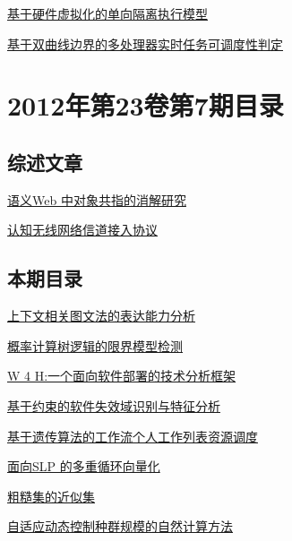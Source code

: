 \documentclass[a4paper]{article}
\begin{document}
\href{http://www.jos.org.cn/ch/reader/download_pdf.aspx?file_no=4131&year_id=2012&quarter_id=8&falg=1}{基于硬件虚拟化的单向隔离执行模型}

\href{http://www.jos.org.cn/ch/reader/download_pdf.aspx?file_no=4139&year_id=2012&quarter_id=8&falg=1}{基于双曲线边界的多处理器实时任务可调度性判定}


\section{\textbf{2012年第23卷第7期目录}}
\subsection{综述文章}
\href{http://www.jos.org.cn/ch/reader/download_pdf.aspx?file_no=4215&year_id=2012&quarter_id=7&falg=1}{语义Web 中对象共指的消解研究}

\href{http://www.jos.org.cn/ch/reader/download_pdf.aspx?file_no=4225&year_id=2012&quarter_id=7&falg=1}{认知无线网络信道接入协议}

\subsection{本期目录}
\href{http://www.jos.org.cn/ch/reader/download_pdf.aspx?file_no=4085&year_id=2012&quarter_id=7&falg=1}{上下文相关图文法的表达能力分析}

\href{http://www.jos.org.cn/ch/reader/download_pdf.aspx?file_no=4089&year_id=2012&quarter_id=7&falg=1}{概率计算树逻辑的限界模型检测}

\href{http://www.jos.org.cn/ch/reader/download_pdf.aspx?file_no=4105&year_id=2012&quarter_id=7&falg=1}{W 4 H:一个面向软件部署的技术分析框架}

\href{http://www.jos.org.cn/ch/reader/download_pdf.aspx?file_no=4126&year_id=2012&quarter_id=7&falg=1}{基于约束的软件失效域识别与特征分析}

\href{http://www.jos.org.cn/ch/reader/download_pdf.aspx?file_no=4222&year_id=2012&quarter_id=7&falg=1}{基于遗传算法的工作流个人工作列表资源调度}

\href{http://www.jos.org.cn/ch/reader/download_pdf.aspx?file_no=4106&year_id=2012&quarter_id=7&falg=1}{面向SLP 的多重循环向量化}

\href{http://www.jos.org.cn/ch/reader/download_pdf.aspx?file_no=4226&year_id=2012&quarter_id=7&falg=1}{粗糙集的近似集}

\href{http://www.jos.org.cn/ch/reader/download_pdf.aspx?file_no=4151&year_id=2012&quarter_id=7&falg=1}{自适应动态控制种群规模的自然计算方法}
\end{document}

